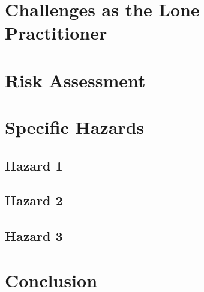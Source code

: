 \documentclass[12pt,a4paper]{article}
\begin{document}
\section{Challenges as the Lone Practitioner}

\section{Risk Assessment}

\section{Specific Hazards}

\subsection{Hazard 1}

\subsection{Hazard 2}

\subsection{Hazard 3}

\section{Conclusion}



\end{document}
